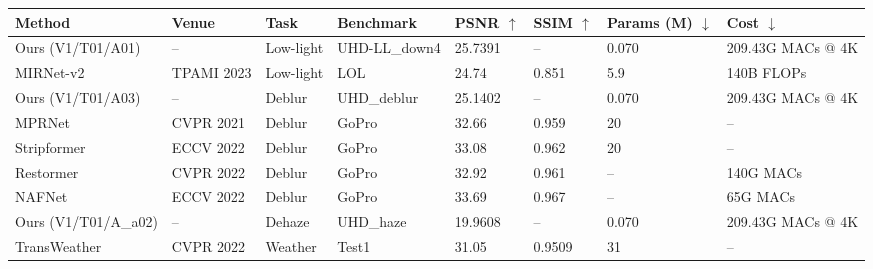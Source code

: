 \documentclass[preview,border=6pt]{standalone}
\begin{document}
\scriptsize
\begin{tabular}{llllllll}
\toprule
Method & Venue & Task & Benchmark & PSNR $\uparrow$ & SSIM $\uparrow$ & Params (M) $\downarrow$ & Cost $\downarrow$ \\
\midrule
Ours (V1/T01/A01) & -- & Low-light & UHD-LL\_down4 & 25.7391 & -- & 0.070 & 209.43G MACs @ 4K \\
MIRNet-v2 & TPAMI 2023 & Low-light & LOL & 24.74 & 0.851 & 5.9 & 140B FLOPs \\
\midrule
Ours (V1/T01/A03) & -- & Deblur & UHD\_deblur & 25.1402 & -- & 0.070 & 209.43G MACs @ 4K \\
MPRNet & CVPR 2021 & Deblur & GoPro & 32.66 & 0.959 & 20 & -- \\
Stripformer & ECCV 2022 & Deblur & GoPro & 33.08 & 0.962 & 20 & -- \\
Restormer & CVPR 2022 & Deblur & GoPro & 32.92 & 0.961 & -- & 140G MACs \\
NAFNet & ECCV 2022 & Deblur & GoPro & 33.69 & 0.967 & -- & 65G MACs \\
\midrule
Ours (V1/T01/A\_a02) & -- & Dehaze & UHD\_haze & 19.9608 & -- & 0.070 & 209.43G MACs @ 4K \\
TransWeather & CVPR 2022 & Weather & Test1 & 31.05 & 0.9509 & 31 & -- \\
\bottomrule
\end{tabular}
\end{document}
